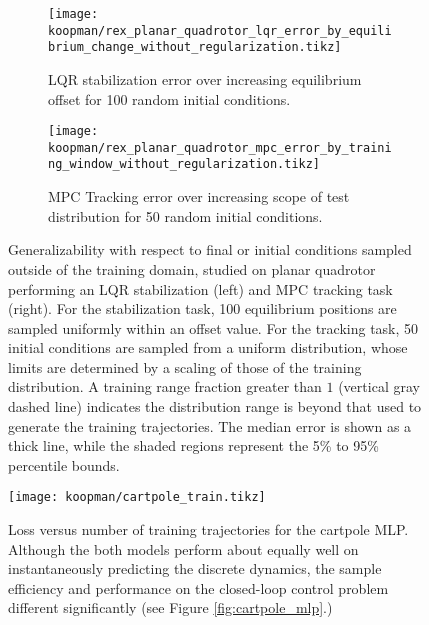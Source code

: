\documentclass[../root.tex]{subfiles}
\newcommand{\changed}[1]{{\color{black} #1}}
\begin{document}
\begin{figure}
  \begin{subfigure}{0.49\textwidth}
    \centering
    \texttt{[image: koopman/rex\_planar\_quadrotor\_lqr\_error\_by\_equilibrium\_change\_without\_regularization.tikz]}
    \caption{LQR stabilization error over increasing equilibrium offset 
    \changed{for 100 random initial conditions.}}
    \label{fig:rex_planar_quadrotor_lqr_error_by_equilibrium_change}
  \end{subfigure}
  \hfill
  \begin{subfigure}{0.48\textwidth}
    \raggedright
    \texttt{[image: koopman/rex\_planar\_quadrotor\_mpc\_error\_by\_training\_window\_without\_regularization.tikz]}
    \caption{MPC Tracking error over increasing scope of test distribution 
        \changed{for 50 random initial conditions.}    
    }
    \label{fig:rex_planar_quadrotor_mpc_error_by_training_window}
  \end{subfigure}
  \caption{Generalizability with respect to final or initial conditions sampled outside of the training domain, studied on planar quadrotor performing an LQR stabilization (left) and MPC tracking task (right). For the stabilization task, \changed{100} equilibrium positions are sampled uniformly within an offset value. For the tracking task, \changed{50} initial conditions are sampled from a uniform distribution, whose limits are determined by a scaling of those of the training distribution. A training range fraction greater than $1$
  \changed{(vertical gray dashed line)} indicates the distribution range is beyond that used to generate 
  the training trajectories.
  \changed{The median error is shown as a thick line, while the shaded regions represent the 5\% to 95\% 
  percentile bounds.}}
  \label{fig:training_window}
\end{figure}

\begin{figure}
    \centering
    \texttt{[image: koopman/cartpole\_train.tikz]}
    \caption{\changed{Loss versus number of training trajectories for the cartpole MLP. 
    Although the both models 
    perform about equally well on instantaneously predicting the discrete dynamics, the sample efficiency
    and performance on the closed-loop control problem different significantly (see Figure \ref{fig:cartpole_mlp}.)}}
    \label{fig:cartpole_train}
    \hfill
\end{figure}
\end{document}
